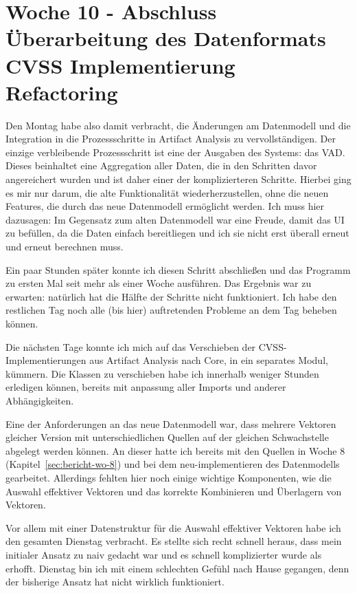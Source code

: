 \section{Woche 10 - Abschluss Überarbeitung des Datenformats \headerand CVSS Implementierung Refactoring} \label{sec:bericht-wo-10}


\lweekdaymarginpar{\weekdayMondayLong}

Den Montag habe also damit verbracht, die Änderungen am Datenmodell und die Integration in die Prozessschritte in Artifact Analysis zu vervollständigen.
Der einzige verbleibende Prozessschritt ist eine der Ausgaben des Systems: das VAD\@.
Dieses beinhaltet eine Aggregation aller Daten, die in den Schritten davor angereichert wurden und ist daher einer der komplizierteren Schritte.
Hierbei ging es mir nur darum, die alte Funktionalität wiederherzustellen, ohne die neuen Features, die durch das neue Datenmodell ermöglicht werden.
Ich muss hier dazusagen: Im Gegensatz zum alten Datenmodell war eine Freude, damit das UI zu befüllen, da die Daten einfach bereitliegen und ich sie nicht erst überall erneut und erneut berechnen muss.

Ein paar Stunden später konnte ich diesen Schritt abschließen und das Programm zu ersten Mal seit mehr als einer Woche ausführen.
Das Ergebnis war zu erwarten: natürlich hat die Hälfte der Schritte nicht funktioniert.
Ich habe den restlichen Tag noch alle (bis hier) auftretenden Probleme an dem Tag beheben können.

\sweekdaymarginpar{\weekdayTuesdayLong}

Die nächsten Tage konnte ich mich auf das Verschieben der CVSS-Implementierungen aus Artifact Analysis nach Core, in ein separates Modul, kümmern.
Die Klassen zu verschieben habe ich innerhalb weniger Stunden erledigen können, bereits mit anpassung aller Imports und anderer Abhängigkeiten.

Eine der Anforderungen an das neue Datenmodell war, dass mehrere Vektoren gleicher Version mit unterschiedlichen Quellen auf der gleichen Schwachstelle abgelegt werden können.
An dieser hatte ich bereits mit den Quellen in Woche 8 (Kapitel\ \ref{sec:bericht-wo-8}) und bei dem neu-implementieren des Datenmodells gearbeitet.
Allerdings fehlten hier noch einige wichtige Komponenten, wie die Auswahl effektiver Vektoren und das korrekte Kombinieren und Überlagern von Vektoren.

Vor allem mit einer Datenstruktur für die Auswahl effektiver Vektoren habe ich den gesamten Dienstag verbracht.
Es stellte sich recht schnell heraus, dass mein initialer Ansatz zu naiv gedacht war und es schnell komplizierter wurde als erhofft.
Dienstag bin ich mit einem schlechten Gefühl nach Hause gegangen, denn der bisherige Ansatz hat nicht wirklich funktioniert.

